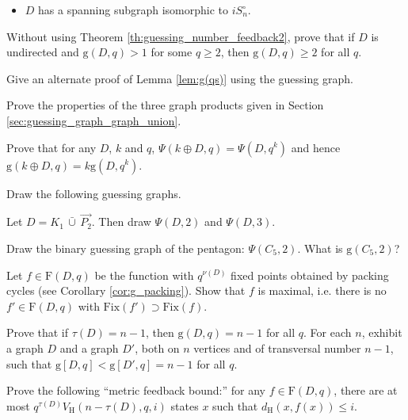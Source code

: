 \documentclass[a4paper, 11pt]{book}
\numberwithin{equation}{section}
\theoremstyle{plain}
\newcommand{\loopfull}[1]{{#1^\circ}}
\newcommand{\feedback}{\tau}
\newcommand{\packing}{\nu}
\newcommand{\bcup}{\,\bar{\cup}\,}
\newcommand{\functions}{\mathrm{F}}
\newcommand{\Fix}{\mathrm{Fix}}
\newcommand{\guessing}{\mathrm{g}}
\newcommand{\guessingGraph}{\Psi}
\newcommand{\dH}{d_\mathrm{H}}
\newcommand{\VH}{V_\mathrm{H}}
\renewcommand{\(}{\ldbrack}
\renewcommand{\)}{\rdbrack}
\begin{document}
\begin{exercises}
\begin{itemize}
	\item $D$ has a spanning subgraph isomorphic to $\loopfull{iS_n}$.
\end{itemize}

\item Without using Theorem \ref{th:guessing_number_feedback2}, prove that if $D$ is undirected and $\guessing(D,q) > 1$ for some $q \ge 2$, then $\guessing(D,q) \ge 2$ for all $q$.


\item Give an alternate proof of Lemma \ref{lem:g(qs)} using the guessing graph. 

\item \label{exerc:graph_products} Prove the properties of the three graph products given in Section \ref{sec:guessing_graph_graph_union}.

\item Prove that for any $D$, $k$ and $q$, $\guessingGraph(k\oplus D,q) = \guessingGraph(D,q^k)$ and hence $\guessing(k \oplus D, q) = k \guessing(D, q^k)$.

\item Draw the following guessing graphs.
\begin{exercises}
	\item Let $D = K_1 \bcup \vec{P_2}$. Then draw $\guessingGraph(D, 2)$ and $\guessingGraph(D, 3)$.
	
	\item Draw the binary guessing graph of the pentagon: $\guessingGraph(C_5,2)$. What is $\guessing(C_5, 2)$?
\end{exercises}

\item Let $f \in \functions(D,q)$ be the function with $q^{\packing(D)}$ fixed points obtained by packing cycles (see Corollary \ref{cor:g_packing}). Show that $f$ is maximal, i.e. there is no $f' \in \functions(D,q)$ with $\Fix(f') \supset \Fix(f)$.


\item \label{exerc:feedback=n-1} Prove that if $\feedback(D) = n-1$, then $\guessing(D, q) = n-1$ for all $q$. For each $n$, exhibit a graph $D$ and a graph $D'$, both on $n$ vertices and of transversal number $n-1$, such that $\guessing[D, q] < \guessing[D', q] = n-1$ for all $q$.



\item \label{exerc:metric_feedback_bound} Prove the following ``metric feedback bound:'' for any $f \in \functions(D, q)$, there are at most $q^{\feedback(D)} \VH(n-\feedback(D), q, i)$ states $x$ such that $\dH(x, f(x)) \le i$.


\end{exercises}
\end{document}
